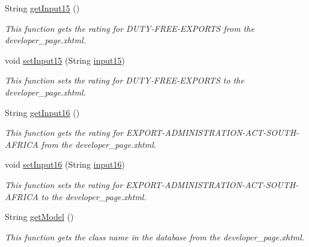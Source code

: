 \begin{DoxyCompactItemize}
String \hyperlink{classorg_1_1jboss_1_1as_1_1quickstarts_1_1greeter_1_1web_1_1_general_controller_a5b5a2578802a124ec66f5a7196f93fcd}{get\+Input15} ()
\begin{DoxyCompactList}\small\item\em This function gets the rating for D\+U\+T\+Y-\/\+F\+R\+E\+E-\/\+E\+X\+P\+O\+R\+TS from the developer\+\_\+page.\+xhtml. \end{DoxyCompactList}\item 
void \hyperlink{classorg_1_1jboss_1_1as_1_1quickstarts_1_1greeter_1_1web_1_1_general_controller_ab034302aa15f5ef6774b18ee9f25b6d9}{set\+Input15} (String \hyperlink{classorg_1_1jboss_1_1as_1_1quickstarts_1_1greeter_1_1web_1_1_general_controller_aca44aa6719378ca1a19c49987cd8c2a5}{input15})
\begin{DoxyCompactList}\small\item\em This function sets the rating for D\+U\+T\+Y-\/\+F\+R\+E\+E-\/\+E\+X\+P\+O\+R\+TS to the developer\+\_\+page.\+xhtml. \end{DoxyCompactList}\item 
String \hyperlink{classorg_1_1jboss_1_1as_1_1quickstarts_1_1greeter_1_1web_1_1_general_controller_a52d8f1adedb7af09f1289aa0ea1a25dd}{get\+Input16} ()
\begin{DoxyCompactList}\small\item\em This function gets the rating for E\+X\+P\+O\+R\+T-\/\+A\+D\+M\+I\+N\+I\+S\+T\+R\+A\+T\+I\+O\+N-\/\+A\+C\+T-\/\+S\+O\+U\+T\+H-\/\+A\+F\+R\+I\+CA from the developer\+\_\+page.\+xhtml. \end{DoxyCompactList}\item 
void \hyperlink{classorg_1_1jboss_1_1as_1_1quickstarts_1_1greeter_1_1web_1_1_general_controller_a2abfe573074e5c0afc22b416f054d924}{set\+Input16} (String \hyperlink{classorg_1_1jboss_1_1as_1_1quickstarts_1_1greeter_1_1web_1_1_general_controller_a3fa8d3eae8cd39f7d90a294181cce4c4}{input16})
\begin{DoxyCompactList}\small\item\em This function sets the rating for E\+X\+P\+O\+R\+T-\/\+A\+D\+M\+I\+N\+I\+S\+T\+R\+A\+T\+I\+O\+N-\/\+A\+C\+T-\/\+S\+O\+U\+T\+H-\/\+A\+F\+R\+I\+CA to the developer\+\_\+page.\+xhtml. \end{DoxyCompactList}\item 
String \hyperlink{classorg_1_1jboss_1_1as_1_1quickstarts_1_1greeter_1_1web_1_1_general_controller_af4f5236b56800bd56d3346ad7032aed5}{get\+Model} ()
\begin{DoxyCompactList}\small\item\em This function gets the class name in the database from the developer\+\_\+page.\+xhtml. \end{DoxyCompactList}\item 

\end{DoxyCompactItemize}
